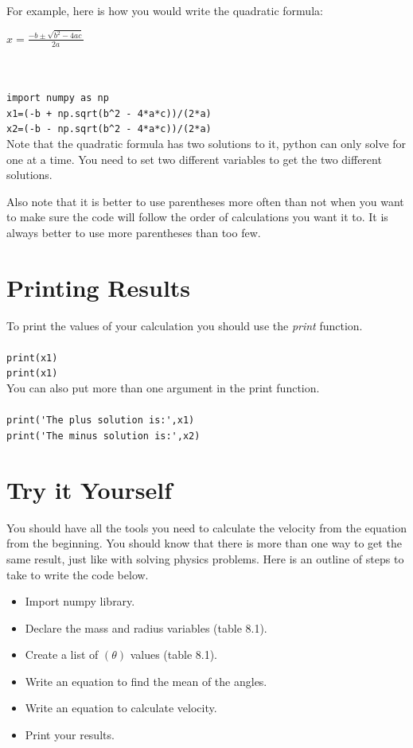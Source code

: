 \documentclass{article}
\begin{document}
For example, here is how you would write the quadratic formula:
\\
\begin{center}
    $x=\frac{-b\pm \sqrt{b^2 -4ac}}{2a}$
\end{center}
\\ \\
\verb|import numpy as np|
\\
\verb|x1=(-b + np.sqrt(b^2 - 4*a*c))/(2*a)|
\\
\verb|x2=(-b - np.sqrt(b^2 - 4*a*c))/(2*a)|
\\

Note that the quadratic formula has two solutions to it, python can only solve for one at a time. You need to set two different variables to get the two different solutions. 

Also note that it is better to use parentheses more often than not when you want to make sure the code will follow the order of calculations you want it to. It is always better to use more parentheses than too few.  

\section{Printing Results}
To print the values of your calculation you should use the \textit{print} function.
\\ \\
\verb|print(x1)|
\\
\verb|print(x1)|
\\

You can also put more than one argument in the print function.
\\ \\
\verb|print('The plus solution is:',x1)|
\\
\verb|print('The minus solution is:',x2)|
\\

\section{Try it Yourself}
You should have all the tools you need to calculate the velocity from the equation from the beginning. You should know that there is more than one way to get the same result, just like with solving physics problems. Here is an outline of steps to take to write the code below.
\begin{itemize}
    \item Import numpy library.
    \item Declare the mass and radius variables (table 8.1).
    \item Create a list of $(\theta)$ values (table 8.1).
    \item Write an equation to find the mean of the angles.
    \item Write an equation to calculate velocity.
    \item Print your results.
\end{itemize}
\end{document}
